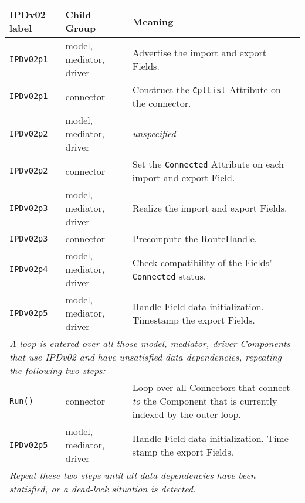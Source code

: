 \vspace*{3ex}
\begin{tabular}[h]{|p{35mm}|p{4cm}|p{6cm}|}
     \hline\hline
     {\bf IPDv02 label} & {\bf Child Group} & {\bf Meaning}\\
     \hline\hline
     {\tt IPDv02p1} & model, mediator, driver & Advertise the import and export Fields.\\ \hline
     {\tt IPDv02p1} & connector               & Construct the {\tt CplList} Attribute on the connector.\\ \hline
     {\tt IPDv02p2} & model, mediator, driver & {\em unspecified}\\ \hline
     {\tt IPDv02p2} & connector               & Set the {\tt Connected} Attribute on each import and export Field.\\ \hline
     {\tt IPDv02p3} & model, mediator, driver & Realize the import and export Fields.\\ \hline
     {\tt IPDv02p3} & connector               & Precompute the RouteHandle.\\ \hline
     {\tt IPDv02p4} & model, mediator, driver & Check compatibility of the Fields' {\tt Connected} status.\\ \hline
     {\tt IPDv02p5} & model, mediator, driver & Handle Field data initialization. Timestamp the export Fields.\\ \hline
     \multicolumn{3}{|p{13.5cm}|}{\it A loop is entered over all those model, mediator, driver Components that use IPDv02 and have
     unsatisfied data dependencies, repeating the following two steps:}\\ \hline
     {\tt Run()}    & connector               & Loop over all Connectors that connect {\it to} the Component that is currently indexed by the outer loop.\\ \hline
     {\tt IPDv02p5} & model, mediator, driver & Handle Field data initialization. Time stamp the export Fields.\\ \hline
     \multicolumn{3}{|p{13.5cm}|}{\it Repeat these two steps until all data
     dependencies have been statisfied, or a dead-lock situation is detected.}\\ 
     \hline\hline
\end{tabular}\newline

